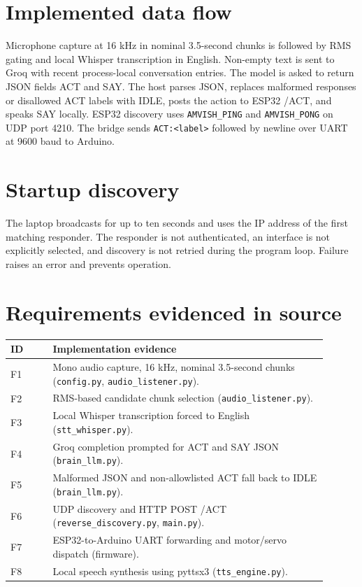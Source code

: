 \documentclass[12pt,a4paper]{report}
\begin{document}
\section{Implemented data flow}
Microphone capture at 16 kHz in nominal 3.5-second chunks is followed by RMS gating and local Whisper transcription in English. Non-empty text is sent to Groq with recent process-local conversation entries. The model is asked to return JSON fields ACT and SAY. The host parses JSON, replaces malformed responses or disallowed ACT labels with IDLE, posts the action to ESP32 /ACT, and speaks SAY locally. ESP32 discovery uses \texttt{AMVISH\_PING} and \texttt{AMVISH\_PONG} on UDP port 4210. The bridge sends \texttt{ACT:<label>} followed by newline over UART at 9600 baud to Arduino.
\section{Startup discovery}
The laptop broadcasts for up to ten seconds and uses the IP address of the first matching responder. The responder is not authenticated, an interface is not explicitly selected, and discovery is not retried during the program loop. Failure raises an error and prevents operation.
\section{Requirements evidenced in source}
\begin{longtable}{p{0.12\linewidth}p{0.78\linewidth}}\toprule ID & Implementation evidence \\\midrule F1 & Mono audio capture, 16 kHz, nominal 3.5-second chunks (\texttt{config.py}, \texttt{audio\_listener.py}). \\ F2 & RMS-based candidate chunk selection (\texttt{audio\_listener.py}). \\ F3 & Local Whisper transcription forced to English (\texttt{stt\_whisper.py}). \\ F4 & Groq completion prompted for ACT and SAY JSON (\texttt{brain\_llm.py}). \\ F5 & Malformed JSON and non-allowlisted ACT fall back to IDLE (\texttt{brain\_llm.py}). \\ F6 & UDP discovery and HTTP POST /ACT (\texttt{reverse\_discovery.py}, \texttt{main.py}). \\ F7 & ESP32-to-Arduino UART forwarding and motor/servo dispatch (firmware). \\ F8 & Local speech synthesis using pyttsx3 (\texttt{tts\_engine.py}). \\\bottomrule\end{longtable}
\end{document}
